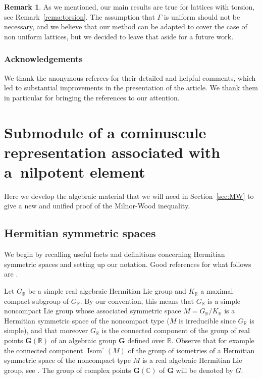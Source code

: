 \documentclass[JEP,XML,SOM,Unicode,NoFloatCountersInSection]{cedram}
\let\cites\cite
\newcommand{\citestar}[3]{\cite[#3]{#1}}
\theoremstyle{plain}
\theoremstyle{definition}
\newtheorem*{rema*}{Remark}
\DeclareMathOperator{\Isom}{Isom}
\newcommand{\bC}{\mathbb{C}}
\newcommand{\bR}{\mathbb{R}}
\newcommand{\bfG}{\boldsymbol{G}}
\begin{document}
\begin{rema*}
As we mentioned, our main results are true for lattices with torsion, see Remark~\ref{rema:torsion}.
The assumption that $\Gamma$ is uniform should not be necessary,
and we believe that our method can be adapted to cover the case of non uniform lattices, but we
decided to leave that aside for a future work.
\end{rema*}

\subsubsection*{Acknowledgements}
We thank the anonymous referees for their detailed and helpful
comments, which led to substantial improvements in the presentation of the article. We thank them in
particular for bringing the references \cites{Gross, ShengZuo} to our attention.

\section{Submodule of a cominuscule representation associated with a~nilpotent element}
\label{sec:subnil}

Here we develop the algebraic material that we will need in Section~\ref{sec:MW} to give a new and
unified proof of the Milnor-Wood inequality.

\subsection{Hermitian symmetric spaces}
\label{subsec:hermitian}

We begin by recalling useful facts and definitions concerning Hermitian symmetric spaces and setting
up our notation. Good references for what follows are \cites{WolfFineStructure,
AshMumfordRapoportTai, Helgason, Knapp}.

Let $G_\bR$ be a simple real algebraic Hermitian Lie group and $K_\bR$ a maximal compact subgroup of
$G_\bR$. By our convention, this means that
$G_\bR$ is a simple noncompact Lie group whose associated symmetric space $M=G_\bR/K_\bR$ is a Hermitian
symmetric space of the noncompact type ($M$ is irreducible
since $G_\bR$ is simple), and that moreover $G_\bR$ is the connected component of the group
of real points $\bfG(\bR)$ of an algebraic group $\bfG$ defined over $\bR$. Observe that for example the connected component
$\Isom^\circ(M)$ of the group of isometries of a Hermitian symmetric space of the noncompact type
$M$ is a real algebraic Hermitian Lie group, see \eg \citestar{AshMumfordRapoportTai}*{p.\,106}. The group of complex points $\bfG(\bC)$ of $\bfG$ will be denoted by $G$.
\end{document}
